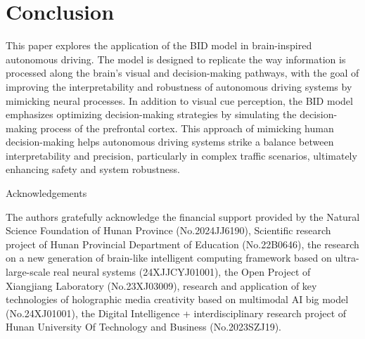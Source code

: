 \documentclass[preprint,12pt]{elsarticle}
\begin{document}
\section{Conclusion}
\label{sec:conclusion}
\hspace{1pc}This paper explores the application of the BID model in brain-inspired autonomous driving. 
The model is designed to replicate the way information is processed along the brain's visual and decision-making pathways, with the goal of improving the interpretability and robustness of autonomous driving systems by mimicking neural processes. 
In addition to visual cue perception, the BID model emphasizes optimizing decision-making strategies by simulating the decision-making process of the prefrontal cortex. 
This approach of mimicking human decision-making helps autonomous driving systems strike a balance between interpretability and precision, particularly in complex traffic scenarios, ultimately enhancing safety and system robustness.



\vspace{2em}

\noindent Acknowledgements
\vspace{1em}

The authors gratefully acknowledge the financial support provided by the Natural Science Foundation of Hunan Province (No.2024JJ6190), Scientific research project of Hunan Provincial Department of Education (No.22B0646), the research on a new generation of brain-like intelligent computing framework based on ultra-large-scale real neural systems (24XJJCYJ01001), the Open Project of Xiangjiang Laboratory (No.23XJ03009), research and application of key technologies of holographic media creativity based on multimodal AI big model (No.24XJ01001), the Digital Intelligence + interdisciplinary research project of Hunan University Of Technology and Business (No.2023SZJ19).




 



\end{document}
